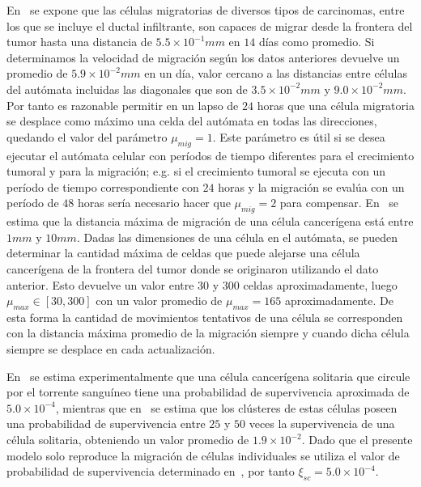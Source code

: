 En~\cite{nurmenniemi} se expone que las c\'elulas migratorias de diversos tipos de carcinomas, entre los que se incluye el ductal infiltrante, son capaces de migrar desde la frontera del tumor hasta una distancia de $5$.$5 \times 10^{-1}mm$ en $14$ d\'ias como promedio. Si determinamos la velocidad de migraci\'on seg\'un los datos anteriores devuelve un promedio de $5$.$9 \times 10^{-2}mm$ en un d\'ia, valor cercano a las distancias entre c\'elulas del aut\'omata incluidas las diagonales que son de $3$.$5 \times 10^{-2}mm$ y $9$.$0 \times 10^{-2}mm$. Por tanto es razonable permitir en un lapso de $24$ horas que una c\'elula migratoria se desplace como m\'aximo una celda del aut\'omata en todas las direcciones, quedando el valor del par\'ametro $\mu_{mig} = 1$. Este par\'ametro es \'util si se desea ejecutar el aut\'omata celular con per\'iodos de tiempo diferentes para el crecimiento tumoral y para la migraci\'on; e.g. si el crecimiento tumoral se ejecuta con un per\'iodo de tiempo correspondiente con $24$ horas y la migraci\'on se eval\'ua con un per\'iodo de $48$ horas ser\'ia necesario hacer que $\mu_{mig} = 2$ para compensar. En~\cite{chaplain} se estima que la distancia m\'axima de migraci\'on de una c\'elula cancer\'igena est\'a entre $1mm$ y $10mm$. Dadas las dimensiones de una c\'elula en el aut\'omata, se pueden determinar la cantidad m\'axima de celdas que puede alejarse una c\'elula cancer\'igena de la frontera del tumor donde se originaron utilizando el dato anterior. Esto devuelve un valor entre $30$ y $300$ celdas aproximadamente, luego $\mu_{max} \in [30,300]$ con un valor promedio de $\mu_{max} = 165$ aproximadamente. De esta forma la cantidad de movimientos tentativos de una c\'elula se corresponden con la distancia m\'axima promedio de la migraci\'on siempre y cuando dicha c\'elula siempre se desplace en cada actualizaci\'on. 

En~\cite{luzzi} se estima experimentalmente que una c\'elula cancer\'igena solitaria que circule por el torrente sangu\'ineo tiene una probabilidad de supervivencia aproximada de $5$.$0 \times 10^{-4}$, mientras que en~\cite{aceto} se estima que los cl\'usteres de estas c\'elulas poseen una probabilidad de supervivencia entre $25$ y $50$ veces la supervivencia de una c\'elula solitaria, obteniendo un valor promedio de $1$.$9 \times 10^{-2}$. Dado que el presente modelo solo reproduce la migraci\'on de c\'elulas individuales se utiliza el valor de probabilidad de supervivencia determinado en~\cite{luzzi}, por tanto $\xi_{sc} = 5$.$0 \times 10^{-4}$. 

